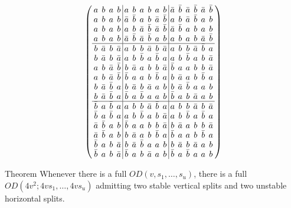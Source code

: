 \documentclass{beamer}
\begin{document}
\begin{frame}

  \[
    \arraycolsep=2.0pt\def\arraystretch{0.75}
    \left(
      \begin{array}{cccc|cccccc|cccccc}
        a&b&a&b&a&b&a&b&a&b&\bar{a}&\bar{b}&\bar{a}&\bar{b}&\bar{a}&\bar{b}\\
        a&b&a&b&\bar{a}&\bar{b}&a&b&\bar{a}&\bar{b}&a&b&\bar{a}&\bar{b}&a&b\\
        a&b&a&b&a&b&\bar{a}&\bar{b}&\bar{a}&\bar{b}&\bar{a}&\bar{b}&a&b&a&b\\
        a&b&a&b&\bar{a}&\bar{b}&\bar{a}&\bar{b}&a&b&a&b&a&b&\bar{a}&\bar{b}\\\hline
        b&\bar{a}&b&\bar{a}&a&b&b&\bar{a}&b&\bar{a}&a&b&b&\bar{a}&\bar{b}&a\\
        b&\bar{a}&b&\bar{a}&a&b&\bar{b}&a&\bar{b}&a&a&b&\bar{b}&a&b&\bar{a}\\
        a&b&\bar{a}&\bar{b}&b&\bar{a}&a&b&b&\bar{a}&\bar{b}&a&a&b&b&\bar{a}\\
        a&b&\bar{a}&\bar{b}&\bar{b}&a&a&b&\bar{b}&a&b&\bar{a}&a&b&\bar{b}&a\\
        b&\bar{a}&\bar{b}&a&b&\bar{a}&b&\bar{a}&a&b&b&\bar{a}&\bar{b}&a&a&b\\
        b&\bar{a}&\bar{b}&a&\bar{b}&a&\bar{b}&a&a&b&\bar{b}&a&b&\bar{a}&a&b\\\hline
        \bar{b}&a&\bar{b}&a&a&b&b&\bar{a}&\bar{b}&a&a&b&b&\bar{a}&b&\bar{a}\\
        \bar{b}&a&\bar{b}&a&a&b&\bar{b}&a&b&\bar{a}&a&b&\bar{b}&a&\bar{b}&a\\
        \bar{a}&\bar{b}&a&b&\bar{b}&a&a&b&b&\bar{a}&b&\bar{a}&a&b&b&\bar{a}\\
        \bar{a}&\bar{b}&a&b&b&\bar{a}&a&b&\bar{b}&a&\bar{b}&a&a&b&\bar{b}&a\\
        \bar{b}&a&b&\bar{a}&b&\bar{a}&\bar{b}&a&a&b&b&\bar{a}&b&\bar{a}&a&b\\
        \bar{b}&a&b&\bar{a}&\bar{b}&a&b&\bar{a}&a&b&\bar{b}&a&\bar{b}&a&a&b\\
      \end{array}
    \right)
  \]
  
\end{frame}

\begin{frame}

  \begin{block}{Theorem \cite[][]{split-od}}
    Whenever there is a full $OD(v,s_1,\dots,s_u)$, there is a full $OD(4v^2;
    4vs_1, \dots, 4vs_u)$ admitting two stable vertical splits and two unstable
    horizontal splits.
  \end{block}
  
\end{frame}
\end{document}
